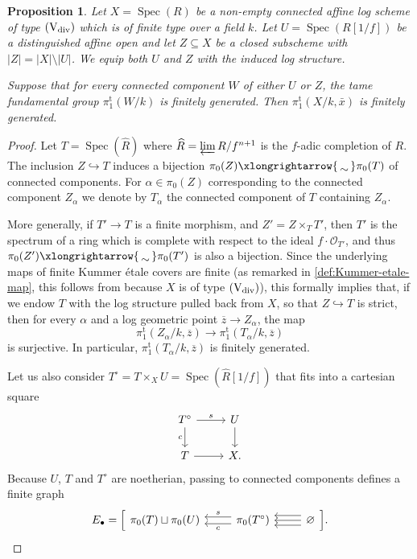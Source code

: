 \documentclass[a4paper,twoside,11pt,reqno]{amsart}
\newcommand{\cO}{{\mathcal O}}
\newcommand{\inj}{\hookrightarrow}
\newcommand{\isomto}{\xlongrightarrow{\,\smash{\raisebox{-0.65ex} 
    {\ensuremath{\displaystyle\sim}}}\,}}
\newcommand{\la}{\longrightarrow}
\DeclareMathOperator{\Spec}{Spec}
\newcommand{\typeVd}{(\mathrm{V}_{\rm div})}
\newcommand{\pitame}{\pi_1^{\mathrm{t}}}
\newtheorem{prop}[thm]{Proposition}
\theoremstyle{definition}
\numberwithin{equation}{subsection}
\begin{document}
\begin{prop} \label{prop:pi1tame-strat}
    Let $X=\Spec(R)$ be a non-empty connected affine log scheme of type $\typeVd$ which is of finite type over a field $k$. Let $U=\Spec(R[1/f])$ be a distinguished affine open and let $Z \subseteq X$ be a closed subscheme with $|Z| = |X|\setminus |U|$. We equip both $U$ and $Z$ with the induced log structure. 
    
    Suppose that for every connected component $W$ of either $U$ or $Z$, the tame fundamental group $\pitame(W/k)$ is finitely generated.     
    Then 
    $\pitame(X/k, \bar x)$ 
    is finitely generated. 
\end{prop}
\begin{proof}
Let $T = \Spec(\widehat{R})$ where $\widehat{R} = \varprojlim R/f^{n+1}$ is the $f$-adic completion of $R$. The inclusion $Z \inj T$ induces a bijection $\pi_0(Z) \isomto \pi_0(T)$ of connected components. For $\alpha \in \pi_0(Z)$ corresponding to the connected component $Z_\alpha$  we denote by $T_\alpha$ the connected component of $T$ containing $Z_\alpha$. 

More generally, if $T'\to T$ is a finite morphism, and $Z' = Z\times_T T'$, then $T'$ is the spectrum of a ring which is complete with respect to the ideal $f\cdot \cO_{T'}$, and thus $\pi_0(Z')\isomto\pi_0(T')$ is also a bijection. Since the underlying maps of finite Kummer \'etale covers are finite (as remarked in \cref{def:Kummer-etale-map}, this follows from \cite[Corollary~5.1.2]{AHLS-Log} because $X$ is of type $\typeVd$), this formally implies that, if we endow $T$ with the log structure pulled back from $X$, so that $Z \inj T$ is strict, then for every $\alpha$ and a log geometric point $\overline{z}\to Z_\alpha$, the map
\[
    \pitame(Z_\alpha/k, \overline{z})\la\pitame(T_\alpha/k,\overline{z})
\]
is surjective. In particular, $\pitame(T_\alpha/k,\overline{z})$ is finitely generated. 


Let us also consider $T^\circ = T\times_X U = \Spec(\widehat{R}[1/f])$ that fits into a cartesian square
\[ 
    \begin{tikzcd}
        T^\circ \ar[r,"s"] \ar[d,"c",swap] & U \ar[d] \\
        T \ar[r] & X.
     \end{tikzcd}
\]
Because $U$, $T$ and $T^\circ$ are noetherian, passing to connected components defines a finite graph 
\[
    E_\bullet = \Big[\begin{tikzcd}
        \pi_0(T) \sqcup \pi_0(U) & \ar[l,"c",shift left=0.7ex] \ar[l,"s",swap,shift right=0.7ex] \pi_0(T^\circ) & \ar[l,shift left=1ex] \ar[l,shift right=1ex] \ar[l] \varnothing  
    \end{tikzcd}\Big].
\]


\end{proof}
\end{document}
